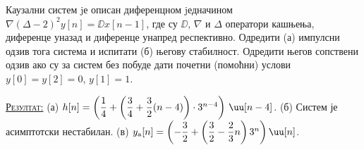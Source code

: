 \PID
Каузални систем jе описан диференцном jедначином 
$\nabla (\Delta - 2)^2 y[n] = \DD x[n - 1]$, где су 
$\DD$, $\nabla$ и $\Delta$ оператори
кашњења, диференце уназад и диференце унапред респективно. 
Одредити (а) импулсни одзив тога система и испитати (б) његову стабилност. 
Одредити његов сопствени одзив ако су за систем без побуде дати почетни
(помоћни) услови $y[0] = y[2] = 0$, $y[1] = 1$.
\vspace*{2mm}

\textsc{\underline{Резултат:}}
(а) $h[n] = \left( 
    \dfrac{1}{4}
    +
    \left(
        \dfrac{3}{4}
        +
        \dfrac{3}{2}
        (n-4)
    \right) \cdot 3^{n-4}
\right)\,\uu[n-4] $.
(б) Систем је асимптотски нестабилан.
(в) $y_{\rm a}[n] = \left(
    -\dfrac{3}{2} + \left(
        \dfrac{3}{2} - \dfrac{2}{3}n
    \right)3^n
\right) \uu[n]$.